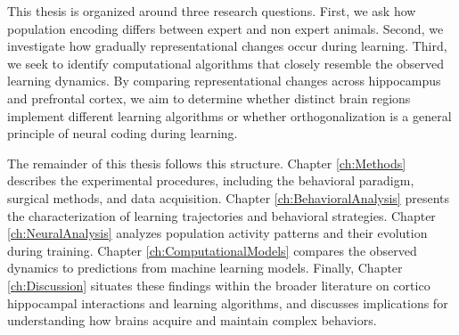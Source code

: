 This thesis is organized around three research questions. First, we ask how population encoding differs between expert and non expert animals. Second, we investigate how gradually representational changes occur during learning. Third, we seek to identify computational algorithms that closely resemble the observed learning dynamics. By comparing representational changes across hippocampus and prefrontal cortex, we aim to determine whether distinct brain regions implement different learning algorithms or whether orthogonalization is a general principle of neural coding during learning.

The remainder of this thesis follows this structure. Chapter \ref{ch:Methods} describes the experimental procedures, including the behavioral paradigm, surgical methods, and data acquisition. Chapter \ref{ch:BehavioralAnalysis} presents the characterization of learning trajectories and behavioral strategies. Chapter \ref{ch:NeuralAnalysis} analyzes population activity patterns and their evolution during training. Chapter \ref{ch:ComputationalModels} compares the observed dynamics to predictions from machine learning models. Finally, Chapter \ref{ch:Discussion} situates these findings within the broader literature on cortico hippocampal interactions and learning algorithms, and discusses implications for understanding how brains acquire and maintain complex behaviors.
